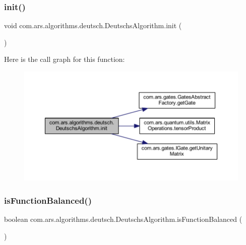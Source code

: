 \subsubsection{\texorpdfstring{init()}{init()}}
{\footnotesize\ttfamily void com.\+ars.\+algorithms.\+deutsch.\+Deutschs\+Algorithm.\+init (\begin{DoxyParamCaption}{ }\end{DoxyParamCaption})}

Here is the call graph for this function\+:\nopagebreak
\begin{figure}[H]
\begin{center}
\leavevmode
\includegraphics[width=350pt]{classcom_1_1ars_1_1algorithms_1_1deutsch_1_1_deutschs_algorithm_a01537777ec24738faf83660313759ea4_cgraph}
\end{center}
\end{figure}
\hypertarget{classcom_1_1ars_1_1algorithms_1_1deutsch_1_1_deutschs_algorithm_ad0d426fd3aa5441adb8892d9ccbe9705}{}\label{classcom_1_1ars_1_1algorithms_1_1deutsch_1_1_deutschs_algorithm_ad0d426fd3aa5441adb8892d9ccbe9705} 
\subsubsection{\texorpdfstring{is\+Function\+Balanced()}{isFunctionBalanced()}}
{\footnotesize\ttfamily boolean com.\+ars.\+algorithms.\+deutsch.\+Deutschs\+Algorithm.\+is\+Function\+Balanced (\begin{DoxyParamCaption}{ }\end{DoxyParamCaption})}

